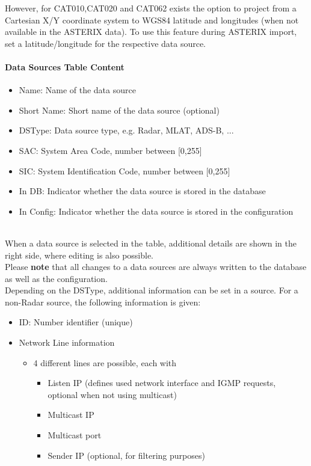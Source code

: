 However, for CAT010,CAT020 and CAT062 exists the option to project from a Cartesian X/Y coordinate system to WGS84 latitude and longitudes (when not available in the ASTERIX data). To use this feature during ASTERIX import, set a latitude/longitude for the respective data source.

\paragraph {Data Sources Table Content}
\label{sec:configure_datasources_table_content}

\begin{itemize}
\item Name: Name of the data source
\item Short Name: Short name of the data source (optional)
\item DSType: Data source type, e.g. Radar, MLAT, ADS-B, ...
\item SAC: System Area Code, number between [0,255]
\item SIC: System Identification Code, number between [0,255]
\item In DB: Indicator whether the data source is stored in the database
\item In Config: Indicator whether the data source is stored in the configuration
\end{itemize}
\ \\

When a data source is selected in the table, additional details are shown in the right side, where editing is also possible. \\

Please \textbf{note} that all changes to a data sources are always written to the database as well as the configuration. \\

Depending on the DSType, additional information can be set in a source. For a non-Radar source, the following information is given:

\begin{itemize}
\item ID: Number identifier (unique)
\item Network Line information
\begin{itemize}
    \item 4 different lines are possible, each with 
    \begin{itemize}
      \item Listen IP (defines used network interface and IGMP requests, optional when not using multicast)
      \item Multicast IP
      \item Multicast port
      \item Sender IP (optional, for filtering purposes)
    \end{itemize}
\end{itemize}
\end{itemize}
\ \\

